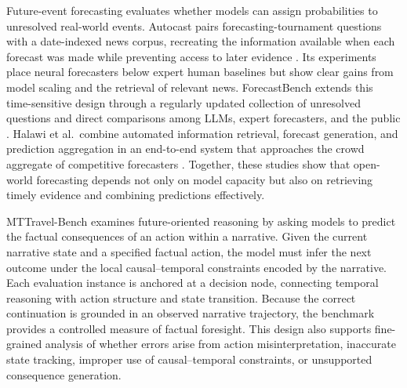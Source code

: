 \documentclass[pdflatex,sn-mathphys-num]{sn-jnl}%
\theoremstyle{thmstyleone}%
\theoremstyle{thmstyletwo}%
\theoremstyle{thmstylethree}%
\begin{document}
Future-event forecasting evaluates whether models can assign probabilities to unresolved real-world events. Autocast pairs forecasting-tournament questions with a date-indexed news corpus, recreating the information available when each forecast was made while preventing access to later evidence \cite{zou2022forecasting}. Its experiments place neural forecasters below expert human baselines but show clear gains from model scaling and the retrieval of relevant news. ForecastBench extends this time-sensitive design through a regularly updated collection of unresolved questions and direct comparisons among LLMs, expert forecasters, and the public \cite{karger2024forecastbench}. Halawi et al.\ combine automated information retrieval, forecast generation, and prediction aggregation in an end-to-end system that approaches the crowd aggregate of competitive forecasters \cite{halawi2024approaching}. Together, these studies show that open-world forecasting depends not only on model capacity but also on retrieving timely evidence and combining predictions effectively.

MTTravel-Bench examines future-oriented reasoning by asking models to predict the factual consequences of an action within a narrative. Given the current narrative state and a specified factual action, the model must infer the next outcome under the local causal--temporal constraints encoded by the narrative. Each evaluation instance is anchored at a decision node, connecting temporal reasoning with action structure and state transition. Because the correct continuation is grounded in an observed narrative trajectory, the benchmark provides a controlled measure of factual foresight. This design also supports fine-grained analysis of whether errors arise from action misinterpretation, inaccurate state tracking, improper use of causal--temporal constraints, or unsupported consequence generation.
\end{document}

